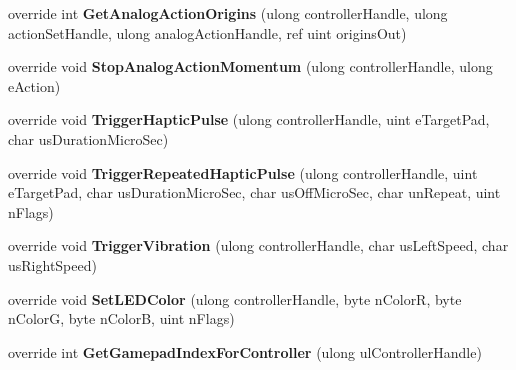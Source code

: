 \begin{DoxyCompactItemize}
\item 
\mbox{\label{class_valve_1_1_steamworks_1_1_c_steam_controller_a3627bcc6c4cffe8683e02a82945c3f16}} 
override int {\bfseries Get\+Analog\+Action\+Origins} (ulong controller\+Handle, ulong action\+Set\+Handle, ulong analog\+Action\+Handle, ref uint origins\+Out)
\item 
\mbox{\label{class_valve_1_1_steamworks_1_1_c_steam_controller_a2e82cc22afb20ee058f92e18ea13adf1}} 
override void {\bfseries Stop\+Analog\+Action\+Momentum} (ulong controller\+Handle, ulong e\+Action)
\item 
\mbox{\label{class_valve_1_1_steamworks_1_1_c_steam_controller_a0f8e733e6accec9bef8c1fee35f38b02}} 
override void {\bfseries Trigger\+Haptic\+Pulse} (ulong controller\+Handle, uint e\+Target\+Pad, char us\+Duration\+Micro\+Sec)
\item 
\mbox{\label{class_valve_1_1_steamworks_1_1_c_steam_controller_a07685ada4b34f1f8482918af64b99b16}} 
override void {\bfseries Trigger\+Repeated\+Haptic\+Pulse} (ulong controller\+Handle, uint e\+Target\+Pad, char us\+Duration\+Micro\+Sec, char us\+Off\+Micro\+Sec, char un\+Repeat, uint n\+Flags)
\item 
\mbox{\label{class_valve_1_1_steamworks_1_1_c_steam_controller_a2f57a5d34284358ee8aab481badd3620}} 
override void {\bfseries Trigger\+Vibration} (ulong controller\+Handle, char us\+Left\+Speed, char us\+Right\+Speed)
\item 
\mbox{\label{class_valve_1_1_steamworks_1_1_c_steam_controller_ad0a375fef834f13794999a485589ea03}} 
override void {\bfseries Set\+L\+E\+D\+Color} (ulong controller\+Handle, byte n\+ColorR, byte n\+ColorG, byte n\+ColorB, uint n\+Flags)
\item 
\mbox{\label{class_valve_1_1_steamworks_1_1_c_steam_controller_af4845be6828441d620ff2c2bc115e11f}} 
override int {\bfseries Get\+Gamepad\+Index\+For\+Controller} (ulong ul\+Controller\+Handle)

\end{DoxyCompactItemize}
